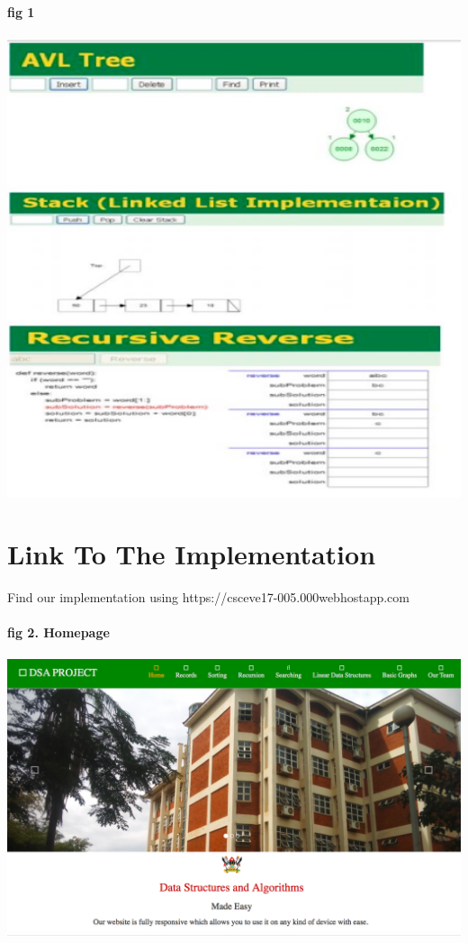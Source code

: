 \documentclass{article}
\begin{document}
\paragraph{fig 1}

\includegraphics[width=1.0\textwidth]{./sample}\\[0.1in]






\section{Link To The Implementation}
Find our implementation using https://csceve17-005.000webhostapp.com
\paragraph{fig 2. Homepage}

\includegraphics[width=1.0\textwidth]{./site}\\[0.1in]
\end{document}
